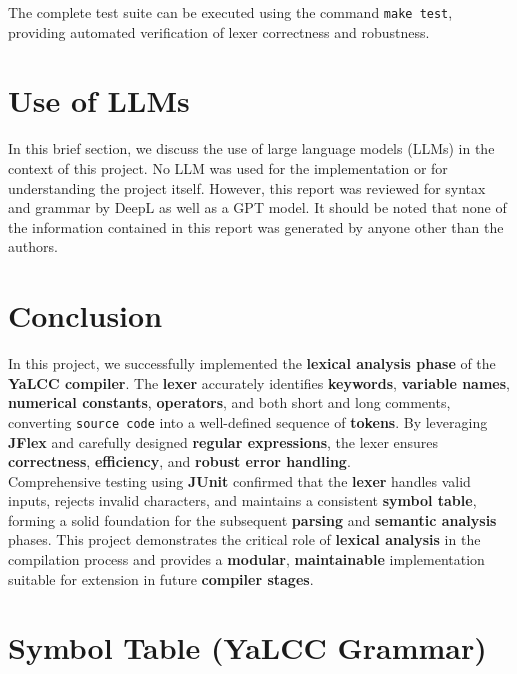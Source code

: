 \documentclass{article}
\begin{document}
\noindent The complete test suite can be executed using the command \texttt{make test}, providing automated verification of lexer correctness and robustness.

\section{Use of LLMs}

\noindent In this brief section, we discuss the use of large language models (LLMs) in the context of this project. No LLM was used for the implementation or for understanding the project itself. However, this report was reviewed for syntax and grammar by DeepL as well as a GPT model. It should be noted that none of the information contained in this report was generated by anyone other than the authors.

\section{Conclusion}

\noindent In this project, we successfully implemented the \textbf{lexical analysis phase} of the \textbf{YaLCC compiler}. The \textbf{lexer} accurately identifies \textbf{keywords}, \textbf{variable names}, \textbf{numerical constants}, \textbf{operators}, and both short and long comments, converting \texttt{source code} into a well-defined sequence of \textbf{tokens}. By leveraging \textbf{JFlex} and carefully designed \textbf{regular expressions}, the lexer ensures \textbf{correctness}, \textbf{efficiency}, and \textbf{robust error handling}. \\

\noindent Comprehensive testing using \textbf{JUnit} confirmed that the \textbf{lexer} handles valid inputs, rejects invalid characters, and maintains a consistent \textbf{symbol table}, forming a solid foundation for the subsequent \textbf{parsing} and \textbf{semantic analysis} phases. This project demonstrates the critical role of \textbf{lexical analysis} in the compilation process and provides a \textbf{modular}, \textbf{maintainable} implementation suitable for extension in future \textbf{compiler stages}.

\newpage

\appendix
\renewcommand{\thesection}{\Alph{section}}
\section{Symbol Table (YaLCC Grammar)}
\label{appendix:symbol-table}
\end{document}
